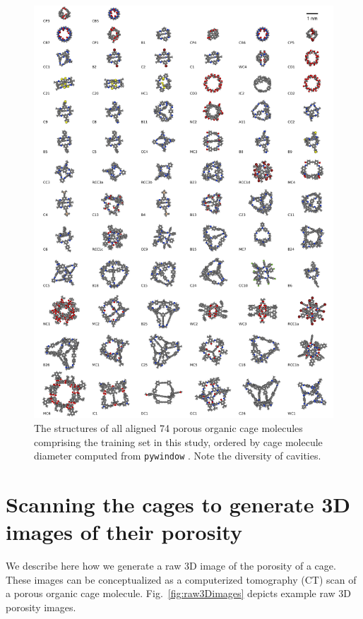 \documentclass[journal=jacsat,manuscript=article,layout=traditional]{achemso}
\begin{document}
\begin{figure}
\centering
	\includegraphics[width=0.9\columnwidth]{../final_aligned_cages/grid_of_cages_labeled.pdf} %
	\caption{The structures of all {\color{red} aligned} 74 porous organic cage molecules \cite{miklitz2017computational,greenaway2018high} comprising the training set in this study, ordered by cage molecule diameter computed from \texttt{pywindow} \cite{miklitz2018pywindow}. Note the diversity of cavities.
	} \label{fig:cages}
\end{figure}

\section{Scanning the cages to generate 3D images of their porosity} We describe here how we generate a raw 3D image of the porosity of a cage. These images can be conceptualized as a computerized tomography (CT) scan of a porous organic cage molecule. Fig.~\ref{fig:raw3Dimages} depicts example raw 3D porosity images.
\end{document}
